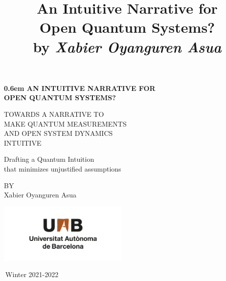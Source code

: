 \documentclass[11pt, a4paper]{article} %
\title{\vspace{-2cm} {\bf An Intuitive Narrative for\\ Open Quantum Systems?}\\{\small by {\em Xabier Oyanguren Asua}}\vspace{-0.8cm}}
\date{\vspace{-11ex}}
\begin{document}
\clearpage
\newcommand\nbvspace[1][3]{\vspace*{\stretch{#1}}}
\newcommand\nbstretchyspace{\spaceskip0.5em plus 0.25em minus 0.25em}
\newcommand{\nbtitlestretch}{\spaceskip0.6em}
\pagestyle{empty}
\begin{center}
\bfseries
\nbvspace[1]
\Huge
{\nbtitlestretch\huge
AN INTUITIVE NARRATIVE FOR\\
OPEN QUANTUM SYSTEMS?
}

\nbvspace[1]
\normalsize

TOWARDS A NARRATIVE TO \\
MAKE QUANTUM MEASUREMENTS\\ 
AND OPEN SYSTEM DYNAMICS\\ INTUITIVE \\

\nbvspace[1]

Drafting a Quantum Intuition\\
that minimizes unjustified assumptions

\nbvspace[1]
\small BY\\
\Large Xabier Oyanguren Asua\\[0.5em]


\nbvspace[6]

\includegraphics[width=2.5in]{UAB.png}
\normalsize
\vspace{-0.5cm}

\large
\small
\small
$\ $Winter 2021-2022
\nbvspace[1]
\end{center}
\newpage
\null
\clearpage
\end{document}
